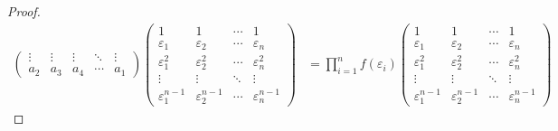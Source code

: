 \documentclass[class=linearalgebra,crop=false]{standalone}
\begin{document}
\begin{proof}
\begin{align*}
\begin{pmatrix}
            \vdots  & \vdots & \vdots & \ddots & \vdots  \\
            a_{2}   & a_{3}  & a_{4}  & \cdots & a_{1}
        \end{pmatrix}
        \begin{pmatrix}
            1                     & 1                     & \cdots & 1                     \\
            \varepsilon_{1}       & \varepsilon_{2}       & \cdots & \varepsilon_{n}       \\
            \varepsilon_{1}^{2}   & \varepsilon_{2}^{2}   & \cdots & \varepsilon_{n}^{2}   \\
            \vdots                & \vdots                & \ddots & \vdots                \\
            \varepsilon_{1}^{n-1} & \varepsilon_{2}^{n-1} & \cdots & \varepsilon_{n}^{n-1}
        \end{pmatrix}
         & = \prod^{n}_{i=1}f(\varepsilon_{i})
        \begin{pmatrix}
            1                     & 1                     & \cdots & 1                     \\
            \varepsilon_{1}       & \varepsilon_{2}       & \cdots & \varepsilon_{n}       \\
            \varepsilon_{1}^{2}   & \varepsilon_{2}^{2}   & \cdots & \varepsilon_{n}^{2}   \\
            \vdots                & \vdots                & \ddots & \vdots                \\
            \varepsilon_{1}^{n-1} & \varepsilon_{2}^{n-1} & \cdots & \varepsilon_{n}^{n-1}
        \end{pmatrix}
    \end{align*}
    \endgroup


\end{proof}
\end{document}
